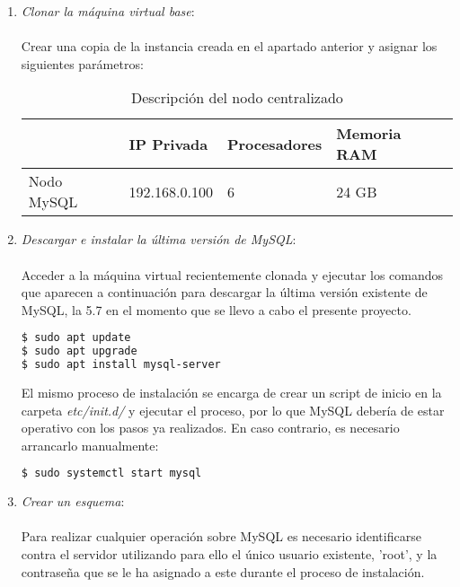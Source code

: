 \begin{enumerate}
	
\item \textit{Clonar la máquina virtual base}:\\\\ Crear una copia de la instancia creada en el apartado anterior y asignar los siguientes parámetros:\\

\begin{table}[h!]
	\centering
	\begin{tabular}{|l||l|l|l|}
		
		\hline
		
		& IP Privada & Procesadores & Memoria RAM \\
		
		\hline
		\hline
		
		Nodo MySQL & 192.168.0.100 & 6 & 24 GB \\
		
		\hline
		
	\end{tabular}
	\caption{Descripción del nodo centralizado}
	\label{nodo-mysql}
\end{table}

\item \textit{Descargar e instalar la última versión de MySQL}:\\\\ Acceder a la máquina virtual recientemente clonada y ejecutar los comandos que aparecen a continuación para descargar la última versión existente de MySQL, la 5.7 en el momento que se llevo a cabo el presente proyecto.\\

\begin{lstlisting}[language=bash]
$ sudo apt update
$ sudo apt upgrade
$ sudo apt install mysql-server
\end{lstlisting}

El mismo proceso de instalación se encarga de crear un script de inicio en la carpeta \textit{etc/init.d/} y ejecutar el proceso, por lo que MySQL debería de estar operativo con los pasos ya realizados. En caso contrario, es necesario arrancarlo manualmente:\\

\begin{lstlisting}[language=bash]
$ sudo systemctl start mysql
\end{lstlisting}

\item \textit{Crear un esquema}:\\\\ Para realizar cualquier operación sobre MySQL es necesario identificarse contra el servidor utilizando para ello  el único usuario existente, 'root', y la contraseña que se le ha asignado a este durante el proceso de instalación.\\


\end{enumerate}
